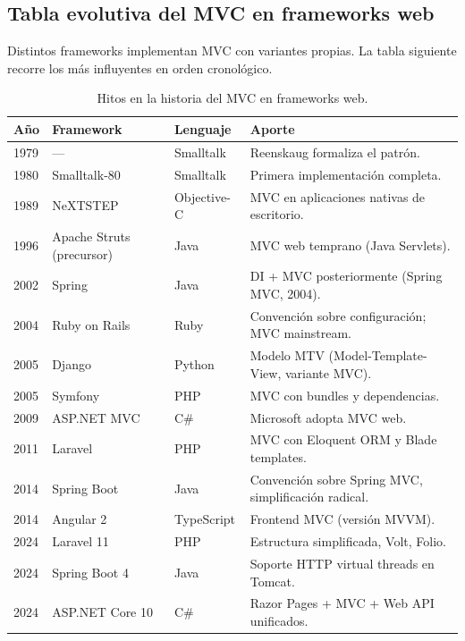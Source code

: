 \subsection{Tabla evolutiva del MVC en frameworks web}

Distintos frameworks implementan MVC con variantes propias.
La tabla siguiente recorre los más influyentes en orden cronológico.


\begin{table}[htbp]
\centering
\caption{Hitos en la historia del MVC en frameworks web.}
\footnotesize
\begin{tabularx}{\textwidth}{lllX}
\toprule
\textbf{Año} & \textbf{Framework} & \textbf{Lenguaje} & \textbf{Aporte}\\
\midrule
1979 & ---           & Smalltalk & Reenskaug formaliza el patrón.\\
1980 & Smalltalk-80  & Smalltalk & Primera implementación completa.\\
1989 & NeXTSTEP      & Objective-C & MVC en aplicaciones nativas de escritorio.\\
1996 & Apache Struts (precursor) & Java & MVC web temprano (Java Servlets).\\
2002 & Spring        & Java & DI + MVC posteriormente (Spring MVC, 2004).\\
2004 & Ruby on Rails & Ruby & Convención sobre configuración; MVC mainstream.\\
2005 & Django        & Python & Modelo MTV (Model-Template-View, variante MVC).\\
2005 & Symfony       & PHP   & MVC con bundles y dependencias.\\
2009 & ASP.NET MVC   & C\#   & Microsoft adopta MVC web.\\
2011 & Laravel       & PHP   & MVC con Eloquent ORM y Blade templates.\\
2014 & Spring Boot   & Java  & Convención sobre Spring MVC, simplificación radical.\\
2014 & Angular 2     & TypeScript & Frontend MVC (versión MVVM).\\
2024 & Laravel 11    & PHP   & Estructura simplificada, Volt, Folio.\\
2024 & Spring Boot 4 & Java & Soporte HTTP virtual threads en Tomcat.\\
2024 & ASP.NET Core 10 & C\#  & Razor Pages + MVC + Web API unificados.\\
\bottomrule
\end{tabularx}
\end{table}

